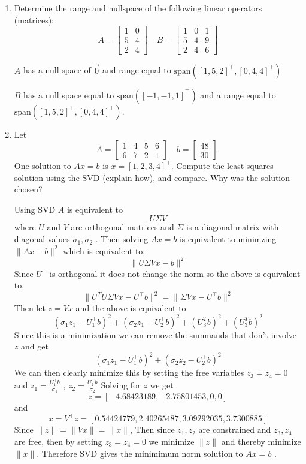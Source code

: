 \documentclass{article}
\begin{document}
\begin{enumerate}
\item
Determine the range and nullspace of the following linear operators (matrices):
$$A=
\begin{bmatrix}
1 & 0 \\
5 & 4 \\
2 & 4
\end{bmatrix}
\quad
B=
\begin{bmatrix}
1 & 0 & 1 \\
5 & 4 & 9 \\
2 & 4 & 6
\end{bmatrix}
$$

\color{blue}
$A$ has a null space of $\vec{0}$ and range equal to $\text{span}([1,5,2]^\top, [0,4,4]^\top)$

$B$ has a null space equal to $\text{span}([-1,-1,1]^\top)$ and a range equal to $\text{span}([1,5,2]^\top, [0,4,4]^\top)$.
\color{black}


\item
Let 
$$A=\begin{bmatrix}
1 & 4 & 5 & 6 \\
6 & 7 & 2 & 1
\end{bmatrix}
\quad
b=\begin{bmatrix}
48\\
30
\end{bmatrix}.$$
One solution to $Ax=b$ is $x=[1,2,3,4]^\top$.  Compute the least-squares solution using the SVD (explain how), and compare. Why was the solution chosen?

\color{blue}
Using SVD $A$ is equivalent to 
$$
U \Sigma V
$$
where $U$ and $V$ are orthogonal matrices and $\Sigma$ is a diagonal matrix with diagonal values $\sigma_1, \sigma_2$ . 
Then solving $Ax = b$ is equivalent to minimzing $\lVert Ax - b \rVert ^ 2$ which is equivalent to,
$$
\lVert U \Sigma V x - b \rVert ^ 2
$$
Since $U^\top$ is orthogonal it does not change the norm so the above is equivalent to,
$$
\lVert U^T U \Sigma V x - U^\top b \rVert ^2 = \lVert \Sigma V x - U^\top b \rVert ^2
$$
Then let $z = V x$ and the above is equivalent to 
$$
(\sigma_1 z_1 - U_1^\top b)^2 + (\sigma_2 z_1 - U_2^\top b)^2  + (U_3^T b)^2 + (U_3^T b)^2
$$
Since this is a minimization we can remove the summands that don't involve $z$ and get
$$
(\sigma_1 z_1 - U_1^\top b)^2 + (\sigma_2 z_2 - U_2^\top b)^2 
$$
We can then clearly minimize this by setting the free variables $z_3 = z_4 = 0$ and
$z_1 = \frac{U_1^\top b}{\sigma_1}$ , $z_2 = \frac{U_2^\top b}{\sigma_2}$
Solving for $z$ we get
$$
z = [-4.68423189, -2.75801453,  0,  0]
$$  
and 
$$
x = V^\top z = [ 0.54424779, 2.40265487, 3.09292035, 3.7300885]
$$
Since $\lVert z \rVert = \lVert Vx \rVert = \lVert x \rVert$,
Then since $z_1, z_2$ are constrained and $z_3, z_4$ are free, then by setting $z_3=z_4=0$ we minimize $\lVert z \rVert$ and thereby minimize $\lVert x \rVert$. Therefore SVD gives the minimimum norm solution to $Ax = b$ .
\color{black}



\end{enumerate}
\end{document}
